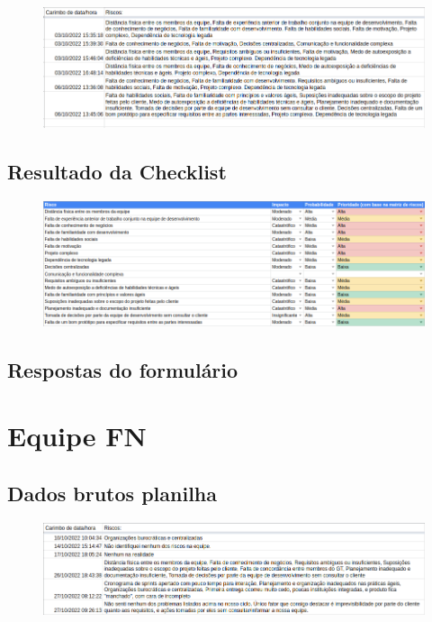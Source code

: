 \documentclass[
    12pt,       %
    openright,      %
    twoside,      %
    a4paper,      %
    english,      %
    french,       %
    spanish,      %
    brazil,       %
    ]{abntex2}
\begin{document}
\begin{apendicesenv}
\begin{figure}[H]
    \centering
    \includegraphics[width=1\textwidth]{src/tex/img/dados-founds.png}
\end{figure}

\subsection{Resultado da Checklist}

\begin{figure}[H]
    \centering
    \includegraphics[width=1\textwidth]{src/tex/img/riscos_founds.png}
\end{figure}

\subsection{Respostas do formulário}

 
 
\section{Equipe FN}
\subsection{Dados brutos planilha}

\begin{figure}[H]
    \centering
    \includegraphics[width=1\textwidth]{src/tex/img/dados-fn.png}
\end{figure}


\end{apendicesenv}
\end{document}
